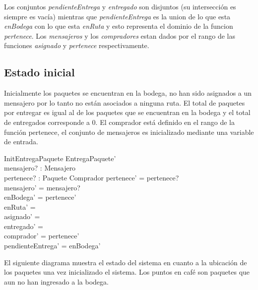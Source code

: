 \documentclass[12pt,a4paper]{article}
\begin{document}
Los conjuntos \textit{pendienteEntrega} y \textit{entregado} son disjuntos (su intersección es siempre es vacía) mientras que \textit{pendienteEntrega} es la union de lo que esta \textit{enBodega} con lo que esta \textit{enRuta} y esto representa el dominio de la funcion \textit{pertenece}. Los \textit{mensajeros} y los \textit{compradores} estan dados por el rango de las funciones \textit{asignado} y \textit{pertenece} respectivamente.

\subsection{Estado inicial}

Inicialmente los paquetes se encuentran en la bodega, no han sido asignados a un mensajero por lo tanto no están asociados a ninguna ruta. El total de paquetes por entregar es igual al de los paquetes que se encuentran en la bodega y el total de entregados corresponde a 0. El comprador está definido en el rango de la función pertenece, el conjunto de mensajeros es inicializado mediante una variable de entrada.

\begin{schema}{InitEntregaPaquete}
EntregaPaquete'\\
mensajero? : \power Mensajero\\
pertenece? : Paquete \pfun Comprador
\where
pertenece' = pertenece?\\
mensajero' = mensajero?\\
enBodega' = \dom pertenece'\\
enRuta' = \emptyset\\
asignado' = \emptyset\\
entregado' = \emptyset\\
comprador' = \ran pertenece'\\
pendienteEntrega' = enBodega'
\end{schema}

El siguiente diagrama muestra el estado del sistema en cuanto a la ubicación de los paquetes una vez inicializado el sistema. Los puntos en café son paquetes que aun no han ingresado a la bodega.
\end{document}
